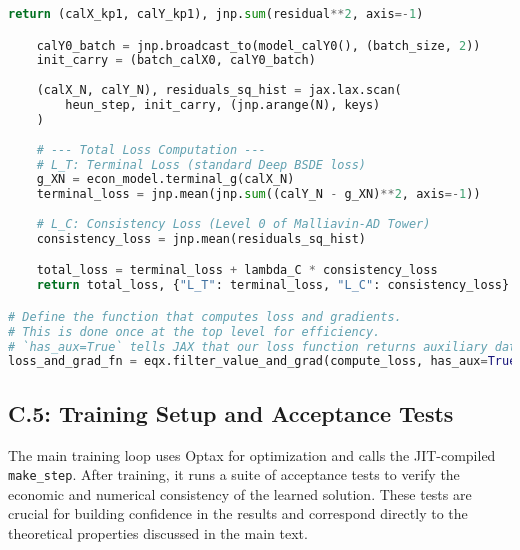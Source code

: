 \begin{lstlisting}[language=Python, caption={C.4: JAX Implementation of the Consistency-Regularized Loss with Heun Scheme.}, label={lst:jax_loss_fn_app_appendix}]
        return (calX_kp1, calY_kp1), jnp.sum(residual**2, axis=-1)

    calY0_batch = jnp.broadcast_to(model_calY0(), (batch_size, 2))
    init_carry = (batch_calX0, calY0_batch)
    
    (calX_N, calY_N), residuals_sq_hist = jax.lax.scan(
        heun_step, init_carry, (jnp.arange(N), keys)
    )
    
    # --- Total Loss Computation ---
    # L_T: Terminal Loss (standard Deep BSDE loss)
    g_XN = econ_model.terminal_g(calX_N)
    terminal_loss = jnp.mean(jnp.sum((calY_N - g_XN)**2, axis=-1))
    
    # L_C: Consistency Loss (Level 0 of Malliavin-AD Tower)
    consistency_loss = jnp.mean(residuals_sq_hist)

    total_loss = terminal_loss + lambda_C * consistency_loss
    return total_loss, {"L_T": terminal_loss, "L_C": consistency_loss}

# Define the function that computes loss and gradients.
# This is done once at the top level for efficiency.
# `has_aux=True` tells JAX that our loss function returns auxiliary data (the dict).
loss_and_grad_fn = eqx.filter_value_and_grad(compute_loss, has_aux=True)
\end{lstlisting}

\subsection{C.5: Training Setup and Acceptance Tests}
The main training loop uses Optax for optimization and calls the JIT-compiled \texttt{make\_step}. After training, it runs a suite of acceptance tests to verify the economic and numerical consistency of the learned solution. These tests are crucial for building confidence in the results and correspond directly to the theoretical properties discussed in the main text.

